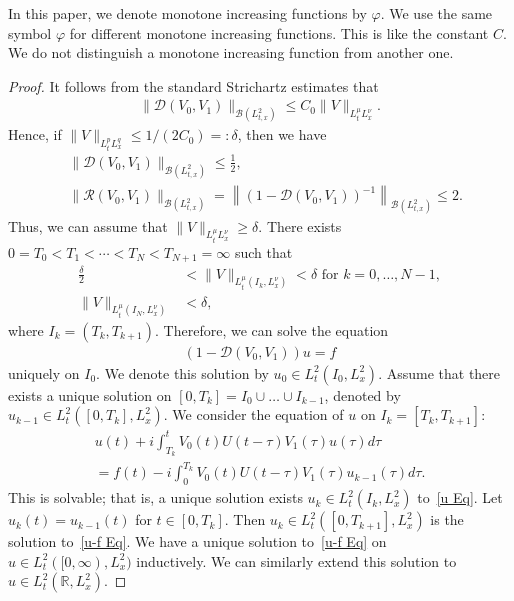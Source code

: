 \documentclass[10pt,a4paper]{amsart}
\newcommand{\CB}{\mathcal{B}}
\newcommand{\CD}{\mathcal{D}}
\newcommand{\CR}{\mathcal{R}}
\newcommand{\de}{\delta}
\newcommand{\ph}{\varphi}
\newcommand{\ta}{\tau}
\newcommand{\I}{\infty}
\newcommand{\R}{\mathbb{R}}
\begin{document}
\begin{rema}
In this paper, we denote monotone increasing functions by $\ph$. We use the same symbol $\ph$ for different monotone increasing functions. This is like the constant $C$. We do not distinguish a monotone increasing function from another one.
\end{rema}


\begin{proof}
It follows from the standard Strichartz estimates that
\begin{align}
\| \CD(V_0,V_1) \|_{\CB\left(L^2_{t,x}\right)} \leq C_0 \|V\|_{L^\mu_tL^\nu_x}.
\end{align}
Hence, if $\|V\|_{L^p_tL^q_x} \leq 1/(2C_0) =: \de$, then we have
\begin{align}
&\| \CD(V_0,V_1) \|_{\CB\left(L^2_{t,x}\right)} \leq \frac{1}{2}, \\
&\|\CR(V_0,V_1)\|_{\CB\left(L^2_{t,x}\right)} = \left\|(1-\CD(V_0,V_1))^{-1}\right\|_{\CB\left(L^2_{t,x}\right)} \leq 2.
\end{align}
Thus, we can assume that $\|V\|_{L^\mu_t L^\nu_x} \geq \de$. There exists $0=T_0 <T_1 < \cdots < T_N<T_{N+1}=\I$ such that
\begin{align}\label{V condi}
\frac{\de}{2} &< \|V\|_{L^\mu_t\left(I_k, L^\nu_x\right)} < \de \text{ for } k = 0,\dots,N-1, \\
\|V\|_{L^\mu_t\left(I_N, L^\nu_x\right)} &< \de,
\end{align}
where $I_k = (T_k, T_{k+1})$. Therefore, we can solve the equation
\begin{align}\label{u-f Eq}
(1-\CD(V_0,V_1))u = f
\end{align}
uniquely on $I_0$. We denote this solution by $u_0 \in L^2_t(I_0,L^2_x)$. Assume that there exists a unique solution on $[0,T_k] = I_0\cup \dots \cup I_{k-1}$, denoted by $u_{k-1} \in L^2_t([0,T_k],L^2_x)$. We consider the equation of $u$ on $I_k = [T_k,T_{k+1}]$:
\begin{multline}\label{u Eq}
u(t) +i\int_{T_k}^t V_0(t)U(t-\ta)V_1(\ta)u(\ta)d\ta \\
= f(t) - i\int_0^{T_k} V_0(t)U(t-\ta)V_1(\ta)u_{k-1}(\ta) d\ta.
\end{multline}
This is solvable; that is, a unique solution exists $u_k \in L^2_t(I_k,L^2_x)$ to~\eqref{u Eq}. Let $u_k(t)=u_{k-1}(t)$ for $t \in [0,T_k]$. Then $u_k \in L^2_t([0,T_{k+1}], L^2_x)$ is the solution to~\eqref{u-f Eq}. We have a unique solution to~\eqref{u-f Eq} on $u \in L^2_t([0,\I),L^2_x)$ inductively. We can similarly extend this solution to $u\in L^2_t(\R, L^2_x)$.


\end{proof}
\end{document}
